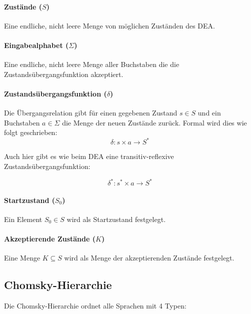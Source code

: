 \documentclass[../main.tex]{subfiles}
\begin{document}
            \paragraph{Zustände ($S$)} Eine endliche, nicht leere Menge von möglichen Zuständen des DEA.
            
            \paragraph{Eingabealphabet ($\Sigma$)} Eine endliche, nicht leere Menge aller Buchstaben die die Zustandsübergangsfunktion akzeptiert.
            
            \paragraph{Zustandsübergangsfunktion ($\delta$)} Die Übergangsrelation gibt für einen gegebenen Zustand $s \in S$ und ein Buchstaben $a \in \Sigma$ die Menge der neuen Zustände zurück. Formal wird dies wie folgt geschrieben:
            	\begin{equation}
            	    \delta: s \times a \rightarrow S^*
            	\end{equation}
            	
            	Auch hier gibt es wie beim DEA eine transitiv-reflexive Zustandsübergangsfunktion: 
            	
            	\begin{equation}
            	    \delta^*: s^* \times a \rightarrow S^*
            	\end{equation}
            	
        	\paragraph{Startzustand ($S_0$)}
                Ein Element $S_0 \in S$ wird als Startzustand festgelegt.
                
    	\paragraph{Akzeptierende Zustände ($K$)}
    	    Eine Menge $K \subseteq S$ wird als Menge der akzeptierenden Zustände festgelegt.
    	    
                    
        \subsection{Chomsky-Hierarchie}
            Die Chomsky-Hierarchie ordnet alle Sprachen mit 4 Typen:
            
\end{document}
